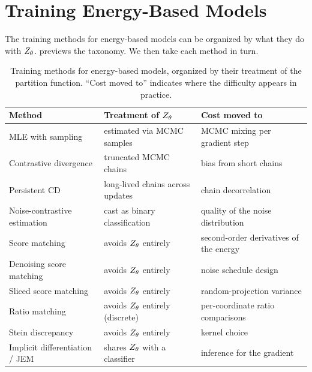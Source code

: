 
\section{Training Energy-Based Models}
\label{sec:ebm_training}

The training methods for energy-based models can be organized by what they do with $Z_\theta$.
 previews the taxonomy.
We then take each method in turn.

\begin{table}[ht]
  \centering
  \small
  \caption{Training methods for energy-based models, organized by their treatment of the partition function.
  ``Cost moved to'' indicates where the difficulty appears in practice.}
  \label{tab:ebm_training}
  \begin{tabular}{@{}lll@{}}
    \toprule
    Method & Treatment of $Z_\theta$ & Cost moved to \\
    \midrule
    MLE with sampling                   & estimated via MCMC samples           & MCMC mixing per gradient step \\
    Contrastive divergence              & truncated MCMC chains                & bias from short chains \\
    Persistent CD                       & long-lived chains across updates     & chain decorrelation \\
    Noise-contrastive estimation        & cast as binary classification        & quality of the noise distribution \\
    Score matching                      & avoids $Z_\theta$ entirely            & second-order derivatives of the energy \\
    Denoising score matching            & avoids $Z_\theta$ entirely            & noise schedule design \\
    Sliced score matching               & avoids $Z_\theta$ entirely            & random-projection variance \\
    Ratio matching                      & avoids $Z_\theta$ entirely (discrete) & per-coordinate ratio comparisons \\
    Stein discrepancy                   & avoids $Z_\theta$ entirely            & kernel choice \\
    Implicit differentiation / JEM      & shares $Z_\theta$ with a classifier   & inference for the gradient \\
    \bottomrule
  \end{tabular}
\end{table}


